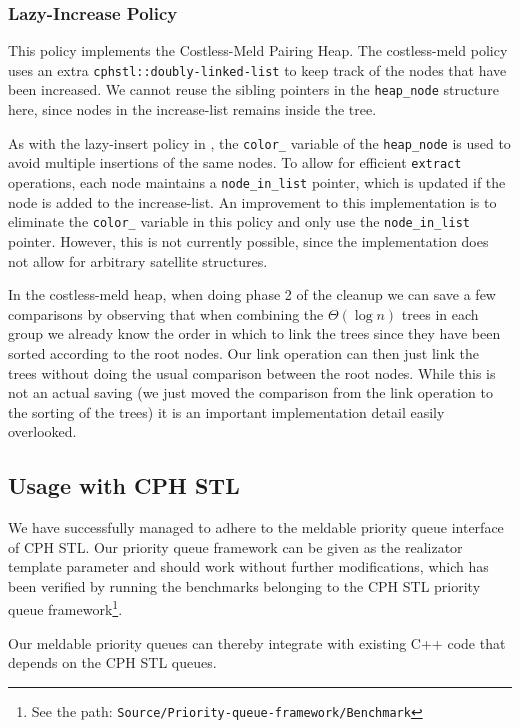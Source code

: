 \documentclass{DIKU-article}[2010/01/13]
\newcommand{\code}[1]{{\small\texttt{#1}}}
\begin{document}
\subsubsection{Lazy-Increase Policy}

This policy implements the Costless-Meld Pairing Heap. The
costless-meld policy uses an extra \code{cphstl::doubly-linked-list}
to keep track of the nodes that have been increased. We cannot reuse
the sibling pointers in the \code{heap\_node} structure here, since
nodes in the increase-list remains inside the tree.

As with the lazy-insert policy in , the
\code{color\_} variable of the \code{heap\_node} is used to avoid
multiple insertions of the same nodes. To allow for efficient
\code{extract} operations, each node maintains a \code{node\_in\_list}
pointer, which is updated if the node is added to the
increase-list. An improvement to this implementation is to eliminate
the \code{color\_} variable in this policy and only use the
\code{node\_in\_list} pointer. However, this is not currently
possible, since the implementation does not allow for arbitrary
satellite structures.

In the costless-meld heap, when doing phase 2 of the cleanup we can
save a few comparisons by observing that when combining the
$\Theta(\log n)$ trees in each group we already know the order in
which to link the trees since they have been sorted according to the
root nodes. Our link operation can then just link the trees without
doing the usual comparison between the root nodes. While this is not
an actual saving (we just moved the comparison from the link operation
to the sorting of the trees) it is an important implementation detail
easily overlooked.

\subsection{Usage with CPH STL}

We have successfully managed to adhere to the meldable priority queue
interface of CPH STL. Our priority queue framework can be given as the
realizator template parameter and should work without further
modifications, which has been verified by running the benchmarks
belonging to the CPH STL priority queue framework\footnote{See the
  path: \code{Source/Priority-queue-framework/Benchmark}}.

Our meldable priority queues can thereby integrate with existing C++
code that depends on the CPH STL queues.
\end{document}
